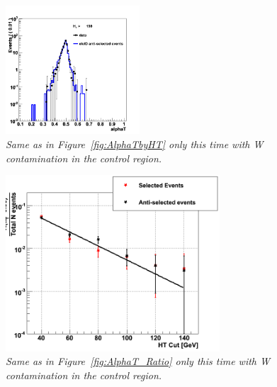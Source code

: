 \begin{figure}[h!]
\hspace*{3mm}
\includegraphics[width=50mm]{Plots/w-alphaT-6}
\caption{\textit{Same as in Figure~\ref{fig:AlphaTbyHT} only this time with W contamination in the control region.}}
\label{fig:w-AlphaTbyHT}
\end{figure}


\begin{figure}[h!]
\begin{center}
\includegraphics[width=80mm]{Plots/w-alphaTratio}
\end{center}
\caption{\textit{Same as in Figure~\ref{fig:AlphaT_Ratio} only this time with W contamination in the control region.}}
\label{fig:w-AlphaT_Ratio}
\end{figure}


